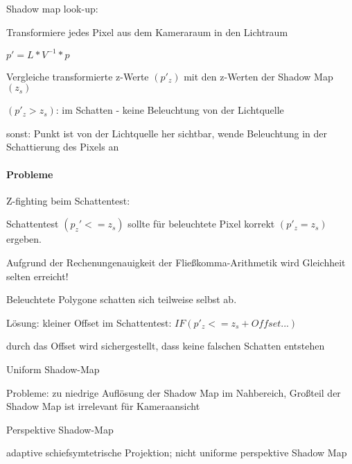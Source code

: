 \documentclass[landscape]{article}
\begin{document}
\begin{multicols}{3}
  
  Shadow map look-up:
  \begin{itemize*}
    \item Transformiere jedes Pixel aus dem Kameraraum in den Lichtraum
    \item $p'=L*V^{-1}*p$
    \item Vergleiche transformierte z-Werte $(p'_z)$ mit den z-Werten der Shadow Map $(z_s)$
    \item $(p'_z>z_s)$: im Schatten - keine Beleuchtung von der Lichtquelle
    \item sonst: Punkt ist von der Lichtquelle her sichtbar, wende Beleuchtung in der Schattierung des Pixels an
  \end{itemize*}
  
  \paragraph{Probleme}
  Z-fighting beim Schattentest:
  \begin{itemize*}
    \item Schattentest $(p_z' <= z_s )$ sollte für beleuchtete Pixel korrekt $(p'_z = z_s)$ ergeben.
    \item Aufgrund der Rechenungenauigkeit der Fließkomma-Arithmetik wird Gleichheit selten erreicht!
    \item Beleuchtete Polygone schatten sich teilweise selbst ab.
    \item Lösung: kleiner Offset im Schattentest: $IF (p'_z <= z_s + Offset...)$
    \item durch das Offset wird sichergestellt, dass keine falschen Schatten entstehen
  \end{itemize*}
  
  Uniform Shadow-Map
  \begin{itemize*}
    \item Probleme: zu niedrige Auflösung der Shadow Map im Nahbereich, Großteil der Shadow Map ist irrelevant für Kameraansicht
  \end{itemize*}
  
  Perspektive Shadow-Map
  \begin{itemize*}
    \item adaptive schiefsymtetrische Projektion; nicht uniforme perspektive Shadow Map
  \end{itemize*}
  

\end{multicols}
\end{document}
